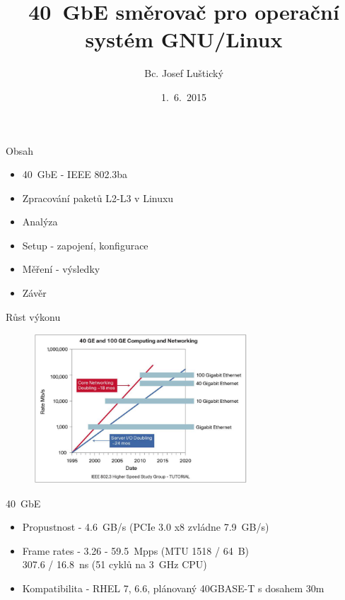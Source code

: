 \documentclass{beamer}
\title{40~GbE směrovač pro operační systém GNU/Linux}
\author{Bc. Josef Luštický}
\date{1.~6.~2015}
\begin{document}
\begin{frame}
  \titlepage
\end{frame}

\expandafter\def\expandafter\insertshorttitle\expandafter{%
  \insertshorttitle\hfill%
  \insertframenumber\,/\,\inserttotalframenumber}

\addtocounter{framenumber}{-1}

\begin{frame}{Obsah}
	\begin{itemize}
		\item 40~GbE - IEEE 802.3ba
		\item Zpracování paketů L2-L3 v Linuxu
		\item Analýza
		\item Setup - zapojení, konfigurace
		\item Měření - výsledky
		\item Závěr
	\end{itemize}
\end{frame}

\begin{frame}{Růst výkonu}
	\begin{figure}
			\centering
			\includegraphics[width=8cm,keepaspectratio]{fig/performance-gap.png}
		\end{figure}
\end{frame}

\begin{frame}{40~GbE}
	\begin{itemize}
		\item Propustnost - 4.6~GB/s (PCIe 3.0 x8 zvládne 7.9~GB/s)
		\item Frame rates - 3.26 - 59.5~Mpps (MTU 1518 / 64~B) \\
		307.6 / 16.8~ns (51 cyklů na 3~GHz CPU)
		\item Kompatibilita - RHEL 7, 6.6, plánovaný 40GBASE-T s dosahem 30m
	\end{itemize}
\end{frame}
\end{document}
